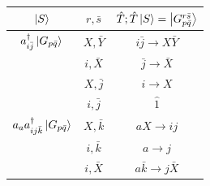 \documentclass[./thesis.tex]{subfiles}
\begin{document}
\begin{table}
\begin{center}
\begin{minipage}[l]{0.6\textwidth}
\begin{tabular}{ c|c|c }
                \hline \hline \rule{0pt}{3ex}
                $\ket S$                                                                        &$ r, \bar s$   & $\hat T ; \hat T \ket S = \ket {G_{p \bar q}^{r \bar s}}$     \\
                \hline \hline \rule{0pt}{3ex}
                $a^\dagger_{i \bar j} \ket {G_{p \bar q}}$                          & $X, \bar Y$   &$i \bar j \rightarrow X \bar Y$                \\
                                                                                        & $i,\bar X$            &$\bar j \rightarrow \bar X$            \\
                                                                                        & $X,\bar j$    &$i \rightarrow X$              \\
                                                                                        & $i,\bar j$    &$\hat 1$                    \\
                                                                                        
                                                                                        
                \hline \rule{0pt}{3ex}
                $a_{a} a^\dagger_{ij \bar k} \ket {G_{p \bar q}}$           &$X,\bar k$             &$aX \rightarrow ij$            \\
                                                                                        &$i,\bar k$             &$a \rightarrow j$              \\
                                                                                        &$i,\bar X$             &$a \bar k \rightarrow j \bar X$                \\
                                                                                        

\end{tabular}
\end{minipage}
\end{center}
\end{table}
\end{document}
